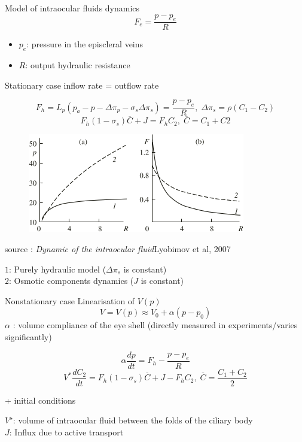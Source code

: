 \begin{frame}{Model of intraocular fluids dynamics}
\[
F_{e}= \frac{p - p_e}{R}
\]
\begin{itemize}

\item $p_e$: pressure in the episcleral veins
\item $R$: output hydraulic resistance
\end{itemize}
\end{frame}



\begin{frame}{Stationary case}
 inflow rate = outflow rate
\begin{block}{}
\[
F_h = L_p \left(p_a-p-\Delta \pi_p - \sigma_s \Delta\pi_s\right) = \frac{p - p_e}{R}, \; \Delta \pi_s = \rho(C_1-C_2)
\]
\[
F_h (1 - \sigma_s) \overline{C} + J = F_hC_2 , \; \overline{C}= C_1+C2
\]

\end{block}
\begin{figure}[H]
\includegraphics[scale=0.7]{images/courbes_pr_fr}
\end{figure}
\begin{center}
\tiny{source : \textit{Dynamic of the intraocular fluid}Lyobimov et al, 2007}
\end{center}
\small{$1$: Purely hydraulic model ($\Delta\pi_s$ is constant)\\
$2$: Osmotic components dynamics ($J$ is constant)}
\end{frame}


\begin{frame}{Nonstationary case}
Linearisation of $V(p)$
\[
V = V(p) \approx V_0 + \alpha (p-p_0)
\]
$\alpha$ : volume compliance of the eye shell (directly measured in experiments/varies significantly)

\begin{block}{}
\[
 \alpha \frac{dp}{dt}=F_{h}-\frac{p-p_e}{R}
 \]
\[
 V^{\ast} \frac{dC_{2}}{dt}= F_h(1-\sigma_s)\overline{C} + J - F_hC_2,\; \overline{C}= \frac{C_1+C_2}{2}
 \]
\begin{center}
+ initial conditions
\end{center} 
\end{block}

$V^\star$: volume of intraocular fluid between the folds of the ciliary body\\
$J$: Influx due to active transport

\end{frame}
